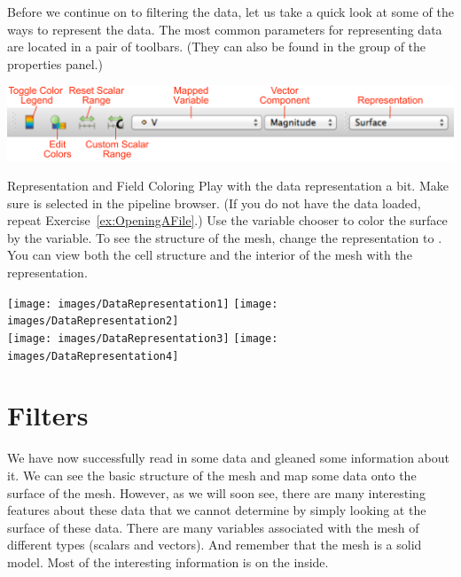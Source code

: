 Before we continue on to filtering the data, let us take a quick look at
some of the ways to represent the data.  The most common parameters for
representing data are located in a pair of toolbars. (They can also be
found in the  group of the properties panel.)

 

\begin{inlinefig}
  \includegraphics[width=\linewidth]{images/DataRepresentationToolbars}
\end{inlinefig}


\begin{exercise}{Representation and Field Coloring}
  \label{ex:RepresentationAndFieldColoring}%
  Play with the data representation a bit. Make sure
   is selected in the pipeline browser. (If you do
  not have the data loaded, repeat Exercise~\ref{ex:OpeningAFile}.) Use the
  variable chooser to color the surface by the  variable. To see
  the structure of the mesh, change the representation to . You can view both the cell structure and the interior of the
  mesh with the  representation.

  \begin{inlinefig}
    \texttt{[image: images/DataRepresentation1]}
    \texttt{[image: images/DataRepresentation2]} \\
    \texttt{[image: images/DataRepresentation3]}
    \texttt{[image: images/DataRepresentation4]}
  \end{inlinefig}
\end{exercise}



\section{Filters}


We have now successfully read in some data and gleaned some information
about it.  We can see the basic structure of the mesh and map some data
onto the surface of the mesh.  However, as we will soon see, there are many
interesting features about these data that we cannot determine by simply
looking at the surface of these data.  There are many variables associated
with the mesh of different types (scalars and vectors).  And remember that
the mesh is a solid model.  Most of the interesting information is on the
inside.

